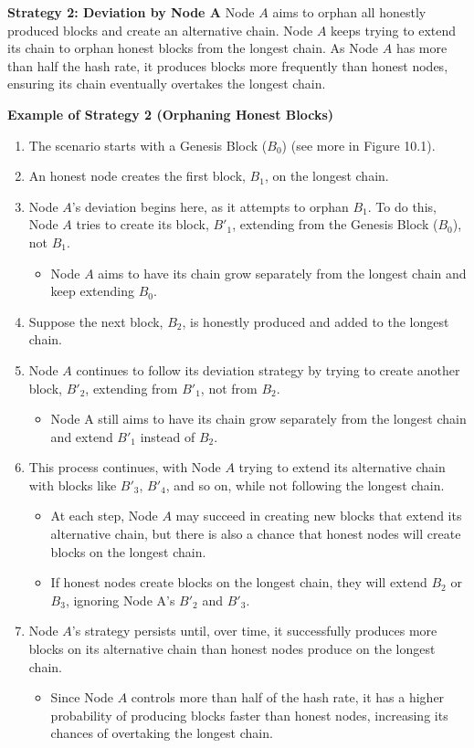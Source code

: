   \textbf{Strategy 2: Deviation by Node A}
  Node $A$ aims to orphan all honestly produced blocks and create an alternative chain. Node $A$ keeps trying to extend its chain to orphan honest blocks from the longest chain. As Node $A$ has more than half the hash rate, it produces blocks more frequently than honest nodes, ensuring its chain eventually overtakes the longest chain. 
  
  
  \noindent
  \textbf{Example of Strategy 2 (Orphaning Honest Blocks)}
  \begin{enumerate}
      \item The scenario starts with a Genesis Block ($B_0$) (see more in Figure 10.1).
      \item An honest node creates the first block, $B_1$, on the longest chain.
      \item Node $A$'s deviation begins here, as it attempts to orphan $B_1$. To do this, Node $A$ tries to create its block, $B'_1$, extending from the Genesis Block ($B_0$), not $B_1$.
      \begin{itemize}
          \item Node $A$ aims to have its chain grow separately from the longest chain and keep extending $B_0$.
      \end{itemize}
      \item Suppose the next block, $B_2$, is honestly produced and added to the longest chain.
      \item Node $A$ continues to follow its deviation strategy by trying to create another block, $B'_2$, extending from $B'_1$, not from $B_2$.
      \begin{itemize}
      \item Node A still aims to have its chain grow separately from the longest chain and extend $B'_1$ instead of $B_2$.
  \end{itemize}
      \item This process continues, with Node $A$ trying to extend its alternative chain with blocks like $B'_3$, $B'_4$, and so on, while not following the longest chain.
      \begin{itemize}
          \item At each step, Node $A$ may succeed in creating new blocks that extend its alternative chain, but there is also a chance that honest nodes will create blocks on the longest chain.
          \item If honest nodes create blocks on the longest chain, they will extend $B_2$ or $B_3$, ignoring Node A's $B'_2$ and $B'_3$.
      \end{itemize}
      \item Node $A$'s strategy persists until, over time, it successfully produces more blocks on its alternative chain than honest nodes produce on the longest chain.
      \begin{itemize}
          \item Since Node $A$ controls more than half of the hash rate, it has a higher probability of producing blocks faster than honest nodes, increasing its chances of overtaking the longest chain.
      \end{itemize}
  \end{enumerate}

